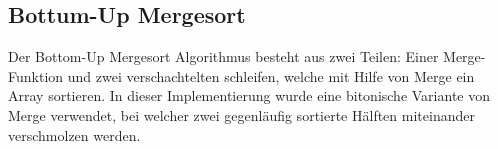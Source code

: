 \subsection{Bottum-Up Mergesort}

Der Bottom-Up Mergesort Algorithmus besteht aus zwei Teilen: Einer Merge-Funktion und zwei verschachtelten schleifen, welche mit Hilfe von Merge ein Array sortieren. In dieser Implementierung wurde eine bitonische Variante von Merge verwendet, bei welcher zwei gegenläufig sortierte Hälften miteinander verschmolzen werden.

